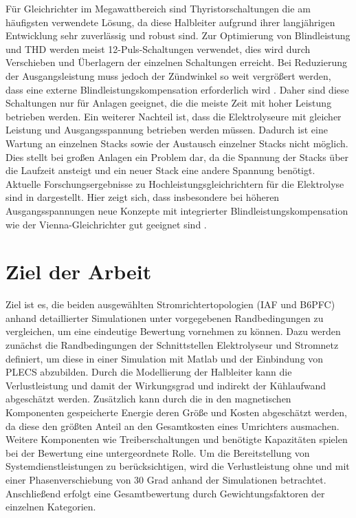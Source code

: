 Für Gleichrichter im Megawattbereich sind Thyristorschaltungen die am häufigsten verwendete Lösung, da diese Halbleiter aufgrund ihrer langjährigen Entwicklung sehr zuverlässig und robust sind. Zur Optimierung von Blindleistung und \gls{THD} werden meist 12-Puls-Schaltungen verwendet, dies wird durch Verschieben und Überlagern der einzelnen Schaltungen erreicht. Bei Reduzierung der Ausgangsleistung muss jedoch der Zündwinkel so weit vergrößert werden, dass eine externe Blindleistungskompensation erforderlich wird \cite{HydrogenElectronicTopologies}. Daher sind diese Schaltungen nur für Anlagen geeignet, die die meiste Zeit mit hoher Leistung betrieben werden. Ein weiterer Nachteil ist, dass die Elektrolyseure mit gleicher Leistung und Ausgangsspannung betrieben werden müssen. Dadurch ist eine Wartung an einzelnen Stacks sowie der Austausch einzelner Stacks nicht möglich. Dies stellt bei großen Anlagen ein Problem dar, da die Spannung der Stacks über die Laufzeit ansteigt und ein neuer Stack eine andere Spannung benötigt.\\
Aktuelle Forschungsergebnisse zu Hochleistungsgleichrichtern für die Elektrolyse sind in \cite{HydrogenRectifier} dargestellt. Hier zeigt sich, dass insbesondere bei höheren Ausgangsspannungen neue Konzepte mit integrierter Blindleistungskompensation wie der Vienna-Gleichrichter gut geeignet sind \cite{HydrogenRectifier}.
\section{Ziel der Arbeit}
Ziel ist es, die beiden ausgewählten Stromrichtertopologien (\gls{IAF} und \gls{B6PFC}) anhand detaillierter Simulationen unter vorgegebenen Randbedingungen zu vergleichen, um eine eindeutige Bewertung vornehmen zu können. Dazu werden zunächst die Randbedingungen der Schnittstellen Elektrolyseur und Stromnetz definiert, um diese in einer Simulation mit Matlab und der Einbindung von PLECS abzubilden. Durch die Modellierung der Halbleiter kann die Verlustleistung und damit der Wirkungsgrad und indirekt der Kühlaufwand abgeschätzt werden. Zusätzlich kann durch die in den magnetischen Komponenten gespeicherte Energie deren Größe und Kosten abgeschätzt werden, da diese den größten Anteil an den Gesamtkosten eines Umrichters ausmachen. Weitere Komponenten wie Treiberschaltungen und benötigte Kapazitäten spielen bei der Bewertung eine untergeordnete Rolle. Um die Bereitstellung von Systemdienstleistungen zu berücksichtigen, wird die Verlustleistung ohne und mit einer Phasenverschiebung von 30 Grad anhand der Simulationen betrachtet. Anschließend erfolgt eine Gesamtbewertung durch Gewichtungsfaktoren der einzelnen Kategorien.